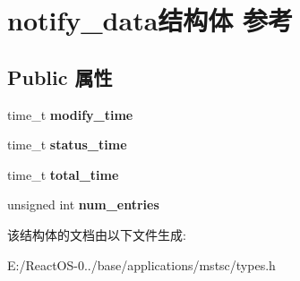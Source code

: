 \hypertarget{structnotify__data}{}\section{notify\+\_\+data结构体 参考}
\label{structnotify__data}
\subsection*{Public 属性}
\begin{DoxyCompactItemize}
\item 
\mbox{\label{structnotify__data_aaded0932853f0cfbabb4ec67aead8a32}} 
time\+\_\+t {\bfseries modify\+\_\+time}
\item 
\mbox{\label{structnotify__data_a80445c1c9f939631ef73c8603f04387e}} 
time\+\_\+t {\bfseries status\+\_\+time}
\item 
\mbox{\label{structnotify__data_a3dc5adcc65e5e5d086c54761862c1408}} 
time\+\_\+t {\bfseries total\+\_\+time}
\item 
\mbox{\label{structnotify__data_aa9252c2adb0d4bdb5dc19efe7b9842df}} 
unsigned int {\bfseries num\+\_\+entries}
\end{DoxyCompactItemize}


该结构体的文档由以下文件生成\+:\begin{DoxyCompactItemize}
\item 
E\+:/\+React\+O\+S-\/0../base/applications/mstsc/types.\+h\end{DoxyCompactItemize}
